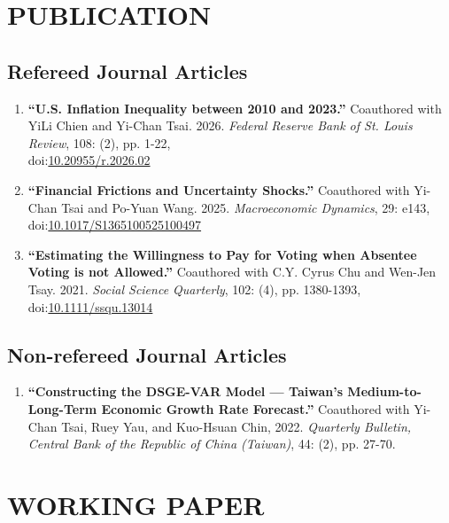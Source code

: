 \documentclass{article}
\newcommand{\cvsubsection}[1]{\subsection*{\rmfamily\hspace{1.6em}#1}}
\begin{document}
\section*{\MakeUppercase{Publication}}

\cvsubsection{Refereed Journal Articles}

\begin{enumerate}
    \item \textbf{“U.S. Inflation Inequality between 2010 and 2023.”} Coauthored with YiLi Chien and Yi-Chan Tsai. 2026. \textit{Federal Reserve Bank of St. Louis Review}, 108: (2), pp. 1-22,\\ doi:\href{https://doi.org/10.20955/r.2026.02}{10.20955/r.2026.02}
    \item \textbf{“Financial Frictions and Uncertainty Shocks.”} Coauthored with Yi-Chan Tsai and Po-Yuan Wang. 2025. \textit{Macroeconomic Dynamics}, 29: e143,\\ doi:\href{https://doi.org/10.1017/S1365100525100497}{10.1017/S1365100525100497}
    \item \textbf{“Estimating the Willingness to Pay for Voting when Absentee Voting is not Allowed.”} Coauthored with C.Y. Cyrus Chu and Wen-Jen Tsay. 2021. \textit{Social Science Quarterly}, 102: (4), pp. 1380-1393,\\ doi:\href{https://doi.org/10.1111/ssqu.13014}{10.1111/ssqu.13014}
\end{enumerate}


\cvsubsection{Non-refereed Journal Articles}

\begin{enumerate}
    \item \textbf{“Constructing the DSGE-VAR Model — Taiwan's Medium-to-Long-Term Economic Growth Rate Forecast.”} Coauthored with Yi-Chan Tsai, Ruey Yau, and Kuo-Hsuan Chin, 2022. \textit{Quarterly Bulletin, Central Bank of the Republic of China (Taiwan)}, 44: (2), pp. 27-70.
\end{enumerate}

\section*{\MakeUppercase{Working Paper}}
\end{document}
